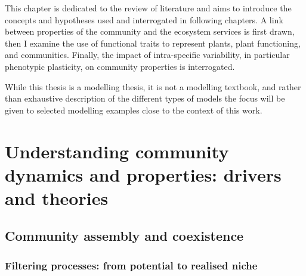 \begin{fullwidth}
This chapter is dedicated to the review of literature and aims to introduce the concepts and hypotheses used and interrogated in following chapters. A link between properties of the community and the ecosystem services is first drawn, then I examine the use of functional traits to represent plants, plant functioning, and communities. Finally, the impact of intra-specific variability, in particular phenotypic plasticity, on community properties is interrogated.

While this thesis is a modelling thesis, it is not a modelling textbook, and rather than exhaustive description of the different types of models the focus will be given to selected modelling examples close to the context of this work.
\end{fullwidth}

\chapter{Understanding community dynamics and properties: drivers and theories}\label{chapter:coexistence}





\section{Community assembly and coexistence}



\subsection{Filtering processes: from potential to realised niche}


